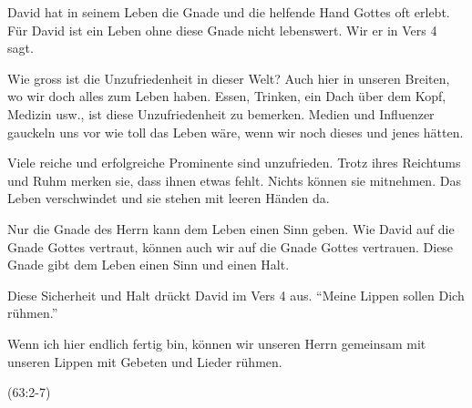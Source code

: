 \documentclass[14pt]{../../inc/mybib}
\begin{document}
    \begin{block}
        David hat in seinem Leben die Gnade und die helfende Hand Gottes oft erlebt. Für David ist ein Leben ohne diese Gnade nicht lebenswert. Wir er in Vers 4 sagt.

        Wie gross ist die Unzufriedenheit in dieser Welt? Auch hier in unseren Breiten, wo wir doch alles zum Leben haben. Essen, Trinken, ein Dach über dem Kopf, Medizin usw., ist diese Unzufriedenheit zu bemerken. Medien und Influenzer gauckeln uns vor wie toll das Leben wäre, wenn wir noch dieses und jenes hätten.
        
        Viele reiche und erfolgreiche Prominente sind unzufrieden. Trotz ihres Reichtums und Ruhm merken sie, dass ihnen etwas fehlt. Nichts können sie mitnehmen. Das Leben verschwindet und sie stehen mit leeren Händen da.
        
        Nur die Gnade des Herrn kann dem Leben einen Sinn geben. Wie David auf die Gnade Gottes vertraut, können auch wir auf die Gnade Gottes vertrauen. Diese Gnade gibt dem Leben einen Sinn und einen Halt. 
    \end{block}

    \begin{block}
        Diese Sicherheit und Halt drückt David im Vers 4 aus. \enquote{Meine Lippen sollen Dich rühmen.}

        Wenn ich hier endlich fertig bin, können wir unseren Herrn gemeinsam mit unseren Lippen mit Gebeten und Lieder rühmen.
    \end{block}
    (63:2-7)
\end{document}

